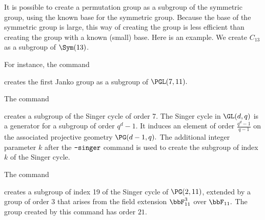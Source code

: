 \bigskip



It is possible to create a permutation group as a subgroup of the symmetric group, 
using the known base for the symmetric group.
Because the base of the symmetric group is large, 
this way of creating the group 
is less efficient than creating the group with a known (small) base.
Here is an example. We create $C_{13}$ as a subgroup of $\Sym(13)$.



\bigskip




For instance, the command


creates the first Janko group as a subgroup of $\PGL(7,11).$ 

\bigskip

The command 


creates a subgroup of the Singer cycle of order 7.
The Singer cycle in $\GL(d,q)$ 
is a generator for a subgroup of order $q^d-1$. 
It induces an element of order $\frac{q^d-1}{q-1}$ 
on the associated projective geometry $\PG(d-1,q).$
The additional integer parameter $k$ after the $\verb'-singer'$ command  is used to 
create the subgroup of index $k$ of the Singer cycle.

\bigskip


The command 


creates a subgroup of index 19 of the Singer cycle of $\PG(2,11)$, 
extended by a group of order $3$ 
that arises from the field extension $\bbF_{11}^3$ over $\bbF_{11}.$ 
The group created by this command has order $21$.


\bigskip


